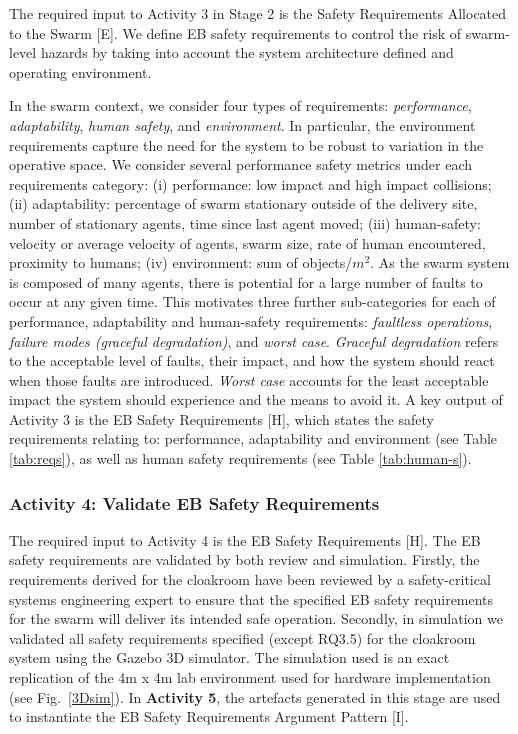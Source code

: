 \documentclass[runningheads]{llncs}
\begin{document}
The required input to Activity 3 in Stage 2 is the Safety Requirements Allocated to the Swarm [E]. 
We define EB safety requirements to control the risk of swarm-level hazards by taking into account the system architecture defined and operating environment. 

In the swarm context, we consider four types of requirements: \emph{performance}, \emph{adaptability}, \emph{human safety}, and \emph{environment}. 
In particular, the environment requirements capture the need for the system to be robust to variation in the operative space.
We consider several performance safety metrics under each requirements category: 
(i) performance: low impact and high impact collisions; 
(ii) adaptability: percentage of swarm stationary outside of the delivery site, number of stationary agents, time since last agent moved; 
(iii) human-safety: velocity or average velocity of agents, swarm size, rate of human encountered, proximity to humans;
(iv) environment: sum of objects/$m^2$.
As the swarm system is composed of many agents, there is potential for a large number of faults to occur at any given time. This motivates three further sub-categories for each of performance, adaptability and human-safety requirements: \emph{faultless operations}, \emph{failure modes (graceful degradation)}, and \emph{worst case}. 
\emph{Graceful degradation} refers to the acceptable level of faults, their impact, and how the system should react when those faults are introduced. \emph{Worst case} accounts for the least acceptable impact the system should experience and the means to avoid it. 
A key output of Activity 3 is the EB Safety Requirements [H], which states the safety requirements relating to: performance, adaptability and environment (see Table \ref{tab:reqs}), as well as human safety requirements (see Table \ref{tab:human-s}).

\vspace{-2ex}
\subsubsection*{Activity 4: Validate EB Safety Requirements}

The required input to Activity 4 is the EB Safety Requirements [H].  
The EB safety requirements are validated by both review and simulation.
Firstly, the requirements derived for the cloakroom have been reviewed by a safety-critical systems engineering expert to ensure that the specified EB safety requirements for the swarm will deliver its intended safe operation. Secondly, in simulation we validated all safety requirements specified (except RQ3.5) for the cloakroom system using the Gazebo 3D simulator. 
The simulation used is an exact replication of the 4m x 4m lab environment used for hardware implementation (see Fig.~\ref{3Dsim}). 
In \textbf{Activity 5}, the artefacts generated in this stage are used to instantiate the EB Safety Requirements Argument Pattern [I].
\end{document}
